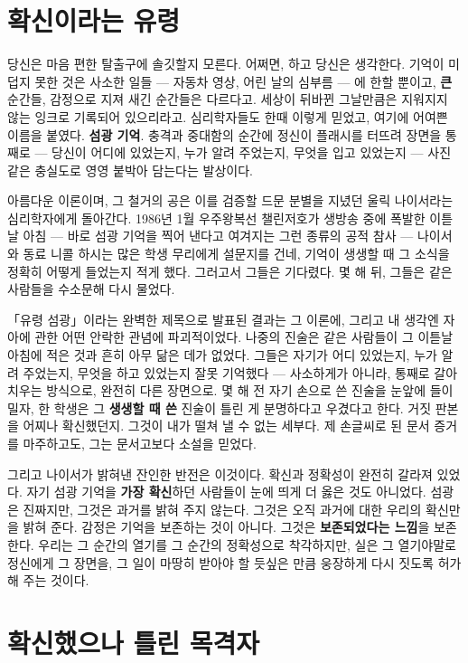 \section*{확신이라는 유령}

당신은 마음 편한 탈출구에 솔깃할지 모른다. 어쩌면, 하고 당신은 생각한다. 기억이 미덥지 못한 것은 사소한 일들 — 자동차 영상, 어린 날의 심부름 — 에 한할 뿐이고, \textbf{큰} 순간들, 감정으로 지져 새긴 순간들은 다르다고. 세상이 뒤바뀐 그날만큼은 지워지지 않는 잉크로 기록되어 있으리라고. 심리학자들도 한때 이렇게 믿었고, 여기에 어여쁜 이름을 붙였다. \textbf{섬광 기억}. 충격과 중대함의 순간에 정신이 플래시를 터뜨려 장면을 통째로 — 당신이 어디에 있었는지, 누가 알려 주었는지, 무엇을 입고 있었는지 — 사진 같은 충실도로 영영 붙박아 담는다는 발상이다.

아름다운 이론이며, 그 철거의 공은 이를 검증할 드문 분별을 지녔던 울릭 나이서라는 심리학자에게 돌아간다. 1986년 1월 우주왕복선 챌린저호가 생방송 중에 폭발한 이튿날 아침 — 바로 섬광 기억을 찍어 낸다고 여겨지는 그런 종류의 공적 참사 — 나이서와 동료 니콜 하시는 많은 학생 무리에게 설문지를 건네, 기억이 생생할 때 그 소식을 정확히 어떻게 들었는지 적게 했다. 그러고서 그들은 기다렸다. 몇 해 뒤, 그들은 같은 사람들을 수소문해 다시 물었다.

「유령 섬광」이라는 완벽한 제목으로 발표된 결과는 그 이론에, 그리고 내 생각엔 자아에 관한 어떤 안락한 관념에 파괴적이었다. 나중의 진술은 같은 사람들이 그 이튿날 아침에 적은 것과 흔히 아무 닮은 데가 없었다. 그들은 자기가 어디 있었는지, 누가 알려 주었는지, 무엇을 하고 있었는지 잘못 기억했다 — 사소하게가 아니라, 통째로 갈아 치우는 방식으로, 완전히 다른 장면으로. 몇 해 전 자기 손으로 쓴 진술을 눈앞에 들이밀자, 한 학생은 그 \textbf{생생할 때 쓴} 진술이 틀린 게 분명하다고 우겼다고 한다. 거짓 판본을 어찌나 확신했던지. 그것이 내가 떨쳐 낼 수 없는 세부다. 제 손글씨로 된 문서 증거를 마주하고도, 그는 문서고보다 소설을 믿었다.

그리고 나이서가 밝혀낸 잔인한 반전은 이것이다. 확신과 정확성이 완전히 갈라져 있었다. 자기 섬광 기억을 \textbf{가장 확신}하던 사람들이 눈에 띄게 더 옳은 것도 아니었다. 섬광은 진짜지만, 그것은 과거를 밝혀 주지 않는다. 그것은 오직 과거에 대한 우리의 확신만을 밝혀 준다. 감정은 기억을 보존하는 것이 아니다. 그것은 \textbf{보존되었다는 느낌}을 보존한다. 우리는 그 순간의 열기를 그 순간의 정확성으로 착각하지만, 실은 그 열기야말로 정신에게 그 장면을, 그 일이 마땅히 받아야 할 듯싶은 만큼 웅장하게 다시 짓도록 허가해 주는 것이다.

\section*{확신했으나 틀린 목격자}

